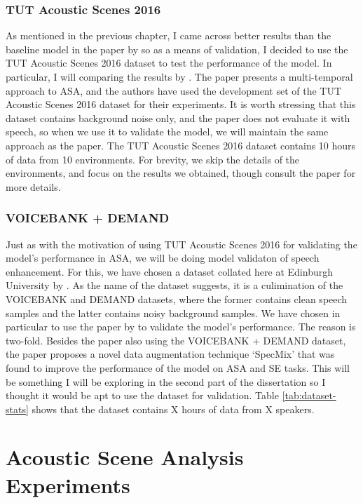 \documentclass[logo,bsc,singlespacing,parskip,online]{infthesis}
\begin{document}
\subsection{TUT Acoustic Scenes 2016}
As mentioned in the previous chapter, I came across better results than the baseline model in the paper by \citet{Huwel2020HearDS} 
so as a means of validation, I decided to use the TUT Acoustic Scenes 2016 dataset \citep{mesaros_tut_2016} to test the performance of the model.
In particular, I will comparing the results by \citet{schindler_multi-temporal_2018}. The paper presents a multi-temporal approach to ASA, and 
the authors have used the development set of the TUT Acoustic Scenes 2016 dataset for their experiments. It is worth stressing 
that this dataset contains background noise only, and the paper does not evaluate it with speech, so when we use it to validate 
the model, we will maintain the same approach as the paper.
The TUT Acoustic Scenes 2016 dataset contains 10 hours of data from 10 environments.
For brevity, we skip the details of the environments, and focus on the results we obtained, though consult the paper for more details.

\subsection{VOICEBANK + DEMAND}
Just as with the motivation of using TUT Acoustic Scenes 2016 for validating the model's performance in ASA,
we will be doing model validaton of speech enhancement. 
For this, we have chosen a dataset collated here at Edinburgh University by \citet{valentini-botinhao_speech_2016}. 
As the name of the dataset suggests, it is a culimination of the VOICEBANK \citep{voicebank} and DEMAND \citep{demand} datasets, 
where the former contains clean speech samples and the latter contains noisy background samples.
We have chosen in particular to use the paper by \citet{kim_specmix_2021} to validate the model's performance.
The reason is two-fold. Besides the paper also using the VOICEBANK + DEMAND dataset, the paper proposes a novel data augmentation technique
`SpecMix' that was found to improve the performance of the model on ASA and SE tasks. This will be something I will be exploring in the 
second part of the dissertation so I thought it would be apt to use the dataset for validation.
Table \ref{tab:dataset-stats} shows that the dataset contains X hours of data from X speakers.

\chapter{Acoustic Scene Analysis Experiments}
\label{chap:acoustic-scene-classification}
\end{document}
